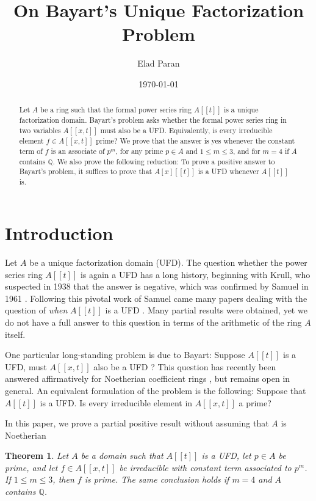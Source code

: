 \documentclass[11pt]{amsart}
\title[Bayart's Power Series Problem]{On Bayart's Unique Factorization Problem}
\author{Elad Paran}
\date{\today}
\newtheorem{theorem}{Theorem}[section]
\theoremstyle{remark}
\newcommand{\Q}{\mathbb Q}
\begin{document}
\begin{abstract}
Let $A$ be a ring such that the formal power series ring $A[[t]]$ is a unique factorization domain. Bayart's problem asks whether the formal power series ring in two variables $A[[x,t]]$ must also be a UFD. Equivalently, is every irreducible element $f\in A[[x,t]]$ prime? We prove that the answer is yes whenever the constant term of $f$ is an associate of $p^m$, for any prime $p \in A$ and $1\leq m\leq3$, and for $m=4$ if $A$ contains $\Q$. We also prove the following reduction: To prove a positive answer to Bayart's problem, it suffices to prove that $A[x][[t]]$ is a UFD whenever $A[[t]]$ is.
\end{abstract}

\maketitle

\section{Introduction}

Let $A$ be a unique factorization domain (UFD). The question whether
the power series ring $A[[t]]$ is again a UFD has a long history, beginning with Krull, who suspected in 1938 \cite{Krull} that the answer is negative, which was confirmed by Samuel in 1961 \cite{Samuel}. Following this pivotal work of Samuel came many papers dealing with the question of {\it when} $A[[t]]$ is a UFD \cite{Bayart80,Bayart81,Buchsbaum,Claborn,DanilovSamuel,DanilovDGC,Lipman,Salmon}. Many partial results were obtained, yet we do not have a full answer to this question in terms of the arithmetic of the ring $A$ itself. 

One particular long-standing problem is due to Bayart: 
Suppose $A[[t]]$ is a UFD, must $A[[x,t]]$ also be a UFD \cite{Bayart73}? This question has recently been answered affirmatively for Noetherian coefficient rings \cite{Tran}, but remains open in general. An equivalent formulation \cite[Lemma~2.1]{Buchsbaum} of the problem is the following: Suppose that $A[[t]]$ is a UFD. Is every irreducible element in $A[[x,t]]$ a prime?

In this paper, we prove a partial positive result without assuming that $A$ is Noetherian

\begin{theorem}\label{thm:small}
Let $A$ be a domain such that $A[[t]]$ is a UFD, let $p\in A$ be
prime, and let $f\in A[[x,t]]$ be irreducible with constant term
associated to $p^m$. If $1\leq m\leq3$, then $f$ is prime. 
The same conclusion holds if $m=4$ and $A$ contains $\Q$.
\end{theorem}
\end{document}
